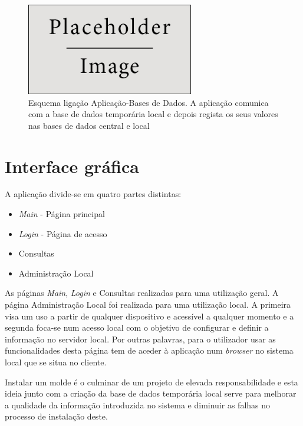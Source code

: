 \documentclass[11pt,twoside,a4paper]{report}
\begin{document}
\begin{figure}[H]
	\begin{center}
		\includegraphics[width=0.65\textwidth]{placeholder} %
		\caption{Esquema ligação Aplicação-Bases de Dados. A aplicação comunica com a base de dados temporária local e depois regista os seus valores nas bases de dados central e local}
		\label{fig:adap4}
	\end{center}
\end{figure}

\section{Interface gráfica}
A aplicação divide-se em quatro partes distintas:
\begin{itemize}[noitemsep]
	\item \textit{Main} - Página principal
	\item \textit{Login} - Página de acesso
	\item Consultas
	\item Administração Local
\end{itemize}
As páginas \textit{Main}, \textit{Login} e Consultas realizadas para uma utilização geral. A página Administração Local foi realizada para uma utilização local. A primeira visa um uso a partir de qualquer dispositivo e acessível a qualquer momento e a segunda foca-se num acesso local com o objetivo de configurar e definir a informação no servidor local. Por outras palavras, para o utilizador usar as funcionalidades desta página tem de aceder à aplicação num \textit{browser} no sistema local que se situa no cliente.\par 
Instalar um molde é o culminar de um projeto de elevada responsabilidade e esta ideia junto com a criação da base de dados temporária local serve para melhorar a qualidade da informação introduzida no sistema e diminuir as falhas no processo de instalação deste.

\newpage
\end{document}
